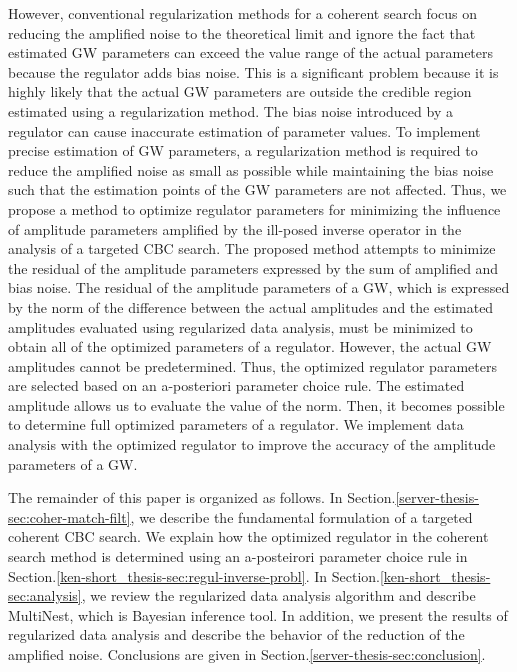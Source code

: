 \documentclass[%
 aps,
 prd,
 amsmath,amssymb,
 reprint,%
superscriptaddress
]{revtex4-1}
\begin{document}
However, conventional regularization methods for a coherent search focus on reducing the amplified noise to the theoretical limit and ignore the fact that estimated GW parameters can exceed the value range of the actual parameters because the regulator adds bias noise\cite{engl1996regularization}. This is a significant problem because it is highly likely that the actual GW parameters are outside the credible region estimated using a regularization method. The bias noise introduced by a regulator can cause inaccurate estimation of parameter values. To implement precise estimation of GW parameters, a regularization method is required to reduce the amplified noise as small as possible while maintaining the bias noise such that the estimation points of the GW parameters are not affected. Thus, we propose a method to optimize regulator parameters for minimizing the influence of amplitude parameters amplified by the ill-posed inverse operator in the analysis of a targeted CBC search. The proposed method attempts to minimize the residual of the amplitude parameters expressed by the sum of amplified and bias noise. The residual of the amplitude parameters of a GW, which is expressed by the norm of the difference between the actual amplitudes and the estimated amplitudes evaluated using regularized data analysis, must be minimized to obtain all of the optimized parameters of a regulator. However, the actual GW amplitudes cannot be predetermined. Thus, the optimized regulator parameters are selected based on an a-posteriori parameter choice rule\cite{engl1996regularization}. The estimated amplitude allows us to evaluate the value of the norm. Then, it becomes possible to determine full optimized parameters of a regulator. We implement data analysis with the optimized regulator to improve the accuracy of the amplitude parameters of a GW.

The remainder of this paper is organized as follows. In Section.\ref{server-thesis-sec:coher-match-filt}, we describe the fundamental formulation of a targeted coherent CBC search. We explain how the optimized regulator in the coherent search method is determined using an a-posteirori parameter choice rule in Section.\ref{ken-short_thesis-sec:regul-inverse-probl}. In Section.\ref{ken-short_thesis-sec:analysis}, we review the regularized data analysis algorithm and describe MultiNest\cite{2009MNRAS.398.1601F}\cite{2013arXiv1306.2144F}, which is Bayesian inference tool. In addition, we present the results of regularized data analysis and describe the behavior of the reduction of the amplified noise. Conclusions are given in Section.\ref{server-thesis-sec:conclusion}.
\end{document}
